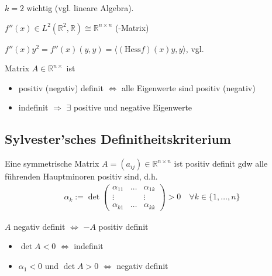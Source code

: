\begin{boldenvironment}
	$k=2$ wichtig (vgl. lineare Algebra).
	
	$f''(x) \in L^2(\mathbb{R}^2,\mathbb{R})\cong \mathbb{R}^{n\times n}$ (-Matrix)
	
	$f''(x) y^2 = f''(x) (y,y) = \langle (\mathrm{Hess} f)(x)y, y\rangle$, vgl. 
	
	Matrix $A\in\mathbb{R}^{n\times}$ ist \begin{itemize}
		\item positiv (negativ) definit $\Leftrightarrow$ alle Eigenwerte sind positiv (negativ) 
		\item indefinit $\Rightarrow$ $\exists$ positive und negative Eigenwerte
	\end{itemize}
\end{boldenvironment}

\subsection{Sylvester'sches Definitheitskriterium}
Eine symmetrische Matrix $A=(a_{ij})\in\mathbb{R}^{n\times n}$ ist positiv definit \gls{gdw} alle führenden Hauptminoren positiv sind, d.h. \begin{align*}
	\alpha_k := \det\begin{pmatrix}
		\alpha_{11} & \dots & \alpha_{1k} \\ \vdots && \vdots \\ \alpha_{k1} & \dots & \alpha_{kk}
	\end{pmatrix} > 0\quad\forall k\in\{1,\dotsc,n\}
\end{align*}

\begin{underlinedenvironment}[beachte]
	$A$ negativ definit $\Leftrightarrow$ $-A$ positiv definit
\end{underlinedenvironment}
\begin{boldenvironment}[Spezialfall $n=2$]\vspace*{0pt}
	\begin{itemize}[topsep=\dimexpr-\baselineskip/2\relax]
		\item $\det A <0 $ $\Leftrightarrow$ indefinit
		\item $\alpha_1 < 0$ und $\det A > 0$ $\Leftrightarrow$ negativ definit
	\end{itemize}
\end{boldenvironment}

